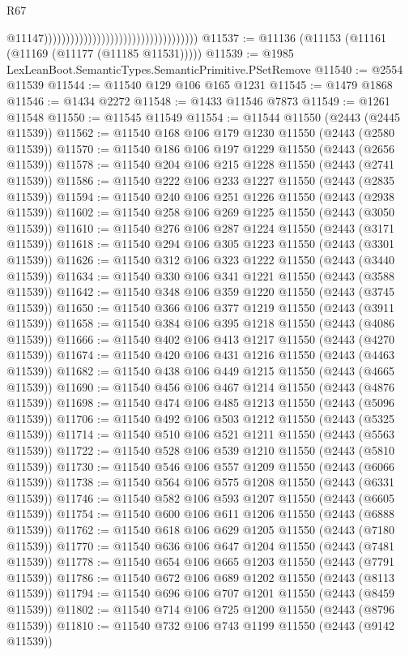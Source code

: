 \begin{lexlean}{R67}
\begin{coremodule}
                                                                          @11147)))))))))))))))))))))))))))))))))))
@11537 := @11136 (@11153 (@11161 (@11169 (@11177 (@11185 @11531)))))
@11539 := @1985 LexLeanBoot.SemanticTypes.SemanticPrimitive.PSetRemove
@11540 := @2554 @11539
@11544 := @11540 @129 @106 @165 @1231
@11545 := @1479 @1868
@11546 := @1434 @2272
@11548 := @1433 @11546 @7873
@11549 := @1261 @11548
@11550 := @11545 @11549
@11554 := @11544 @11550 (@2443 (@2445 @11539))
@11562 := @11540 @168 @106 @179 @1230 @11550 (@2443 (@2580 @11539))
@11570 := @11540 @186 @106 @197 @1229 @11550 (@2443 (@2656 @11539))
@11578 := @11540 @204 @106 @215 @1228 @11550 (@2443 (@2741 @11539))
@11586 := @11540 @222 @106 @233 @1227 @11550 (@2443 (@2835 @11539))
@11594 := @11540 @240 @106 @251 @1226 @11550 (@2443 (@2938 @11539))
@11602 := @11540 @258 @106 @269 @1225 @11550 (@2443 (@3050 @11539))
@11610 := @11540 @276 @106 @287 @1224 @11550 (@2443 (@3171 @11539))
@11618 := @11540 @294 @106 @305 @1223 @11550 (@2443 (@3301 @11539))
@11626 := @11540 @312 @106 @323 @1222 @11550 (@2443 (@3440 @11539))
@11634 := @11540 @330 @106 @341 @1221 @11550 (@2443 (@3588 @11539))
@11642 := @11540 @348 @106 @359 @1220 @11550 (@2443 (@3745 @11539))
@11650 := @11540 @366 @106 @377 @1219 @11550 (@2443 (@3911 @11539))
@11658 := @11540 @384 @106 @395 @1218 @11550 (@2443 (@4086 @11539))
@11666 := @11540 @402 @106 @413 @1217 @11550 (@2443 (@4270 @11539))
@11674 := @11540 @420 @106 @431 @1216 @11550 (@2443 (@4463 @11539))
@11682 := @11540 @438 @106 @449 @1215 @11550 (@2443 (@4665 @11539))
@11690 := @11540 @456 @106 @467 @1214 @11550 (@2443 (@4876 @11539))
@11698 := @11540 @474 @106 @485 @1213 @11550 (@2443 (@5096 @11539))
@11706 := @11540 @492 @106 @503 @1212 @11550 (@2443 (@5325 @11539))
@11714 := @11540 @510 @106 @521 @1211 @11550 (@2443 (@5563 @11539))
@11722 := @11540 @528 @106 @539 @1210 @11550 (@2443 (@5810 @11539))
@11730 := @11540 @546 @106 @557 @1209 @11550 (@2443 (@6066 @11539))
@11738 := @11540 @564 @106 @575 @1208 @11550 (@2443 (@6331 @11539))
@11746 := @11540 @582 @106 @593 @1207 @11550 (@2443 (@6605 @11539))
@11754 := @11540 @600 @106 @611 @1206 @11550 (@2443 (@6888 @11539))
@11762 := @11540 @618 @106 @629 @1205 @11550 (@2443 (@7180 @11539))
@11770 := @11540 @636 @106 @647 @1204 @11550 (@2443 (@7481 @11539))
@11778 := @11540 @654 @106 @665 @1203 @11550 (@2443 (@7791 @11539))
@11786 := @11540 @672 @106 @689 @1202 @11550 (@2443 (@8113 @11539))
@11794 := @11540 @696 @106 @707 @1201 @11550 (@2443 (@8459 @11539))
@11802 := @11540 @714 @106 @725 @1200 @11550 (@2443 (@8796 @11539))
@11810 := @11540 @732 @106 @743 @1199 @11550 (@2443 (@9142 @11539))

\end{coremodule}
\end{lexlean}
